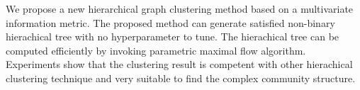 We propose a new hierarchical graph clustering method based on a multivariate information metric.
The proposed method can generate satisfied non-binary hierachical tree with no hyperparameter to tune. 
The hierachical tree can be computed efficiently by 
invoking parametric maximal flow algorithm. 
Experiments show that the clustering result is competent with 
other hierachical clustering technique and very suitable to find the complex community structure.